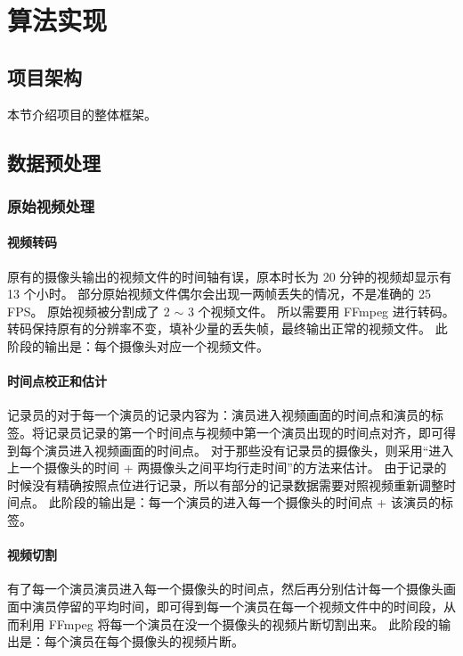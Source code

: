 \chapter{算法实现}\label{sec:algorithm}

\section{项目架构}
本节介绍项目的整体框架。

\section{数据预处理}

\subsection{原始视频处理}

\subsubsection{视频转码}
原有的摄像头输出的视频文件的时间轴有误，原本时长为 20 分钟的视频却显示有 13 个小时。
部分原始视频文件偶尔会出现一两帧丢失的情况，不是准确的 25 FPS。
原始视频被分割成了 2 $\sim$ 3 个视频文件。
所以需要用 FFmpeg 进行转码。转码保持原有的分辨率不变，填补少量的丢失帧，最终输出正常的视频文件。
此阶段的输出是：每个摄像头对应一个视频文件。

\subsubsection{时间点校正和估计}
记录员的对于每一个演员的记录内容为：演员进入视频画面的时间点和演员的标签。将记录员记录的第一个时间点与视频中第一个演员出现的时间点对齐，即可得到每个演员进入视频画面的时间点。
对于那些没有记录员的摄像头，则采用“进入上一个摄像头的时间 + 两摄像头之间平均行走时间”的方法来估计。
由于记录的时候没有精确按照点位进行记录，所以有部分的记录数据需要对照视频重新调整时间点。
此阶段的输出是：每一个演员的进入每一个摄像头的时间点 + 该演员的标签。

\subsubsection{视频切割}
有了每一个演员演员进入每一个摄像头的时间点，然后再分别估计每一个摄像头画面中演员停留的平均时间，即可得到每一个演员在每一个视频文件中的时间段，从而利用 FFmpeg 将每一个演员在没一个摄像头的视频片断切割出来。
此阶段的输出是：每个演员在每个摄像头的视频片断。

